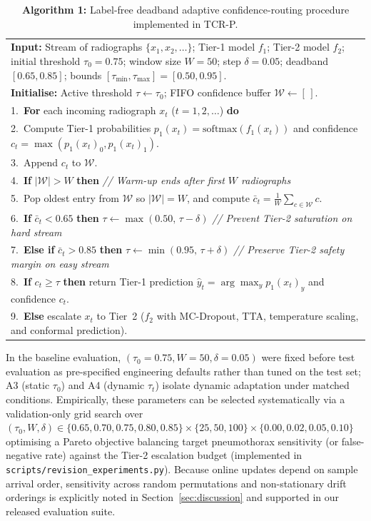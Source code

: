 \documentclass[diagnostics,article,submit,moreauthors]{Definitions/mdpi}
\newcommand{\rev}[1]{#1}
\begin{document}
\begin{table}[H]
\caption{\rev{\textbf{Algorithm 1:} Label-free deadband adaptive confidence-routing procedure implemented in TCR-P.}}\label{tab:algo_routing}
\begin{tabular}{@{}p{}@{}}
\toprule
\textbf{Input:} Stream of radiographs $\{x_1, x_2, \dots\}$; Tier-1 model $f_1$; Tier-2 model $f_2$; initial threshold $\tau_0=0.75$; window size $W=50$; step $\delta=0.05$; deadband $[0.65, 0.85]$; bounds $[\tau_{\min}, \tau_{\max}] = [0.50, 0.95]$.\\
\textbf{Initialise:} Active threshold $\tau \leftarrow \tau_0$; FIFO confidence buffer $\mathcal{W} \leftarrow [\,]$.\\
\midrule
1.\ \textbf{For} each incoming radiograph $x_t$ ($t = 1, 2, \dots$) \textbf{do}\\
2.\ \quad Compute Tier-1 probabilities $p_1(x_t) = \mathrm{softmax}(f_1(x_t))$ and confidence $c_t = \max(p_1(x_t)_0, p_1(x_t)_1)$.\\
3.\ \quad Append $c_t$ to $\mathcal{W}$.\\
4.\ \quad \textbf{If} $|\mathcal{W}| > W$ \textbf{then} \quad \textit{// Warm-up ends after first $W$ radiographs}\\
5.\ \quad \quad Pop oldest entry from $\mathcal{W}$ so $|\mathcal{W}| = W$, and compute $\bar{c}_t = \frac{1}{W}\sum_{c \in \mathcal{W}} c$.\\
6.\ \quad \quad \textbf{If} $\bar{c}_t < 0.65$ \textbf{then} $\tau \leftarrow \max(0.50,\, \tau - \delta)$ \quad \textit{// Prevent Tier-2 saturation on hard stream}\\
7.\ \quad \quad \textbf{Else if} $\bar{c}_t > 0.85$ \textbf{then} $\tau \leftarrow \min(0.95,\, \tau + \delta)$ \quad \textit{// Preserve Tier-2 safety margin on easy stream}\\
8.\ \quad \textbf{If} $c_t \ge \tau$ \textbf{then} return Tier-1 prediction $\hat{y}_t = \arg\max_y p_1(x_t)_y$ and confidence $c_t$.\\
9.\ \quad \textbf{Else} escalate $x_t$ to Tier~2 ($f_2$ with MC-Dropout, TTA, temperature scaling, and conformal prediction).\\
\bottomrule
\end{tabular}
\end{table}

\rev{In the baseline evaluation, $(\tau_0=0.75, W=50, \delta=0.05)$ were fixed before test evaluation as pre-specified engineering defaults rather than tuned on the test set; A3 (static $\tau_0$) and A4 (dynamic $\tau_t$) isolate dynamic adaptation under matched conditions. Empirically, these parameters can be selected systematically via a validation-only grid search over $(\tau_0, W, \delta) \in \{0.65, 0.70, 0.75, 0.80, 0.85\} \times \{25, 50, 100\} \times \{0.00, 0.02, 0.05, 0.10\}$ optimising a Pareto objective balancing target pneumothorax sensitivity (or false-negative rate) against the Tier-2 escalation budget (implemented in \texttt{scripts/revision\_experiments.py}). Because online updates depend on sample arrival order, sensitivity across random permutations and non-stationary drift orderings is explicitly noted in Section~\ref{sec:discussion} and supported in our released evaluation suite.}
\end{document}
